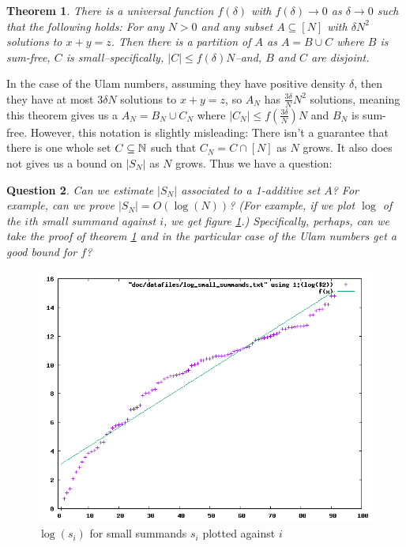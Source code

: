 \documentclass{report}
\newtheorem{theorem}{Theorem}[section]
\newtheorem{question}[theorem]{Question}
\theoremstyle{remark}
\numberwithin{equation}{section}
\begin{document}
\begin{theorem}\label{thm:green_triangle_removal}
  There is a universal function $f(\delta)$ with $f(\delta) \to 0$ as
  $\delta \to 0$ such that the following holds: For any $N > 0$ and
  any subset $A \subseteq [N]$ with $\delta N^2$ solutions to $x+y=z$.
  Then there is a partition of $A$ as $A = B \cup C$ where $B$ is
  sum-free, $C$ is small--specifically, $|C| \leq f(\delta)N$--and,
  $B$ and $C$ are disjoint.
\end{theorem}

In the case of the Ulam numbers, assuming they have positive density
$\delta$, then they have at most $3\delta N$ solutions to $x+y=z$, so
$A_N$ has $\frac{3\delta}{N} N^2$ solutions, meaning this theorem
gives us a $A_N = B_N \cup C_N$ where
$|C_N| \leq f(\frac{3\delta}{N})N$ and $B_N$ is sum-free.  However,
this notation is slightly misleading: There isn't a guarantee that
there is one whole set $C \subseteq \mathbb{N}$ such that $C_N = C \cap [N]$
as $N$ grows.  It also does not gives us a bound on $|S_N|$ as $N$
grows.  Thus we have a question:

\begin{question}
  Can we estimate $|S_N|$ associated to a 1-additive set $A$?  For
  example, can we prove $|S_N| = O(\log(N))$?  (For example, if we
  plot $\log$ of the $i$th small summand against $i$, we get figure
  \ref{fig:log_ss}.)  Specifically, perhaps, can we take the proof of
  theorem \ref{thm:green_triangle_removal} and in the particular case
  of the Ulam numbers get a good bound for $f$?
\end{question}

\begin{figure}
\caption{$\log(s_i)$ for small summands $s_i$ plotted against
  $i$}\label{fig:log_ss}
\centering
\includegraphics[scale=0.5]{../figs/log_ss.png}
\end{figure}
\end{document}
